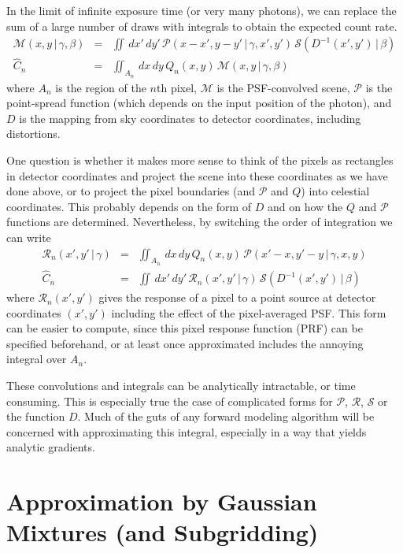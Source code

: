 \documentclass[modern]{aastex62}
\newcommand{\given}{\,|\,}
\newcommand{\countrate}{\hat{C}}
\newcommand{\model}{\mathcal{M}}
\newcommand{\psf}{\mathcal{P}}
\newcommand{\prf}{\mathcal{R}}
\newcommand{\qe}{Q}
\newcommand{\scene}{\mathcal{S}}
\begin{document}
In the limit of infinite exposure time (or very many photons), we can replace
the sum of a large number of draws with integrals to obtain the expected count
rate.
\begin{eqnarray}
\label{eqn:psf_convolve}
\model(x, y \given \gamma, \beta) & = & \iint \, dx' \, dy' \, \psf(x - x', y-y' \given \gamma, x', y') \, \scene( D^{-1}(x', y') \given \beta) \\
\countrate_n & = & \iint_{A_n} \, dx \, dy \, \qe_n(x, y) \, \model(x, y \given \gamma, \beta) \nonumber
\end{eqnarray}
where $A_n$ is the region of the $n$th pixel, 
$\model$ is the PSF-convolved scene,
$\psf$ is the point-spread function (which depends on the input position of the photon),
and $D$ is the mapping from sky coordinates to detector coordinates, including distortions.

One question is whether it makes more sense to think of the pixels as rectangles
in detector coordinates and project the scene into these coordinates as we have
done above, or to project the pixel boundaries (and $\psf$ and $\qe$) into
celestial coordinates. This probably depends on the form of $D$ and on how the
$\qe$ and $\psf$ functions are determined. Nevertheless, by switching the order
of integration we can write
\begin{eqnarray}
\label{eqn:prf_integral}
\prf_n(x', y' \given \gamma) & = & \iint_{A_n} \, dx \, dy \, \qe_n(x, y) \, \psf(x' - x, y' - y \given \gamma, x, y) \\
\countrate_n & = & \iint \, dx' \, dy' \, \prf_n(x', y' \given \gamma) \, \scene( D^{-1}(x', y') \given \beta) \nonumber
\end{eqnarray}
where $\prf_n(x', y')$ gives the response of a pixel to a point source at detector coordinates $(x', y')$ including the effect of the pixel-averaged PSF.
This form can be easier to compute, since this pixel response function (PRF) can
be specified beforehand, or at least once approximated includes the annoying
integral over $A_n$.

These convolutions and integrals can be analytically intractable, or time
consuming. This is especially true the case of complicated forms for $\psf$,
$\prf$, $\scene$ or the function $D$. Much of the guts of any forward modeling
algorithm will be concerned with approximating this integral, especially in a
way that yields analytic gradients.


\section{Approximation by Gaussian Mixtures (and Subgridding)}
\end{document}
